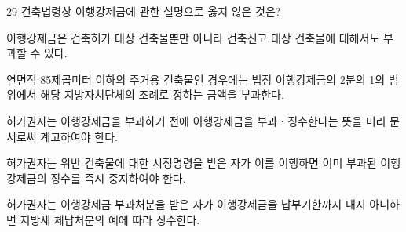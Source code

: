 \begin{question}{29}
건축법령상 이행강제금에 관한 설명으로 옳지 않은 것은?
\begin{choices}
  \item 이행강제금은 건축허가 대상 건축물뿐만 아니라 건축신고 대상 건축물에 대해서도 부과할 수 있다.
  \item 연면적 85제곱미터 이하의 주거용 건축물인 경우에는 법정 이행강제금의 2분의 1의 범위에서 해당 지방자치단체의 조례로 정하는 금액을 부과한다.
  \item 허가권자는 이행강제금을 부과하기 전에 이행강제금을 부과ㆍ징수한다는 뜻을 미리 문서로써 계고하여야 한다.
  \item 허가권자는 위반 건축물에 대한 시정명령을 받은 자가 이를 이행하면 이미 부과된 이행강제금의 징수를 즉시 중지하여야 한다.
  \item 허가권자는 이행강제금 부과처분을 받은 자가 이행강제금을 납부기한까지 내지 아니하면 지방세 체납처분의 예에 따라 징수한다.
\end{choices}
\end{question}

